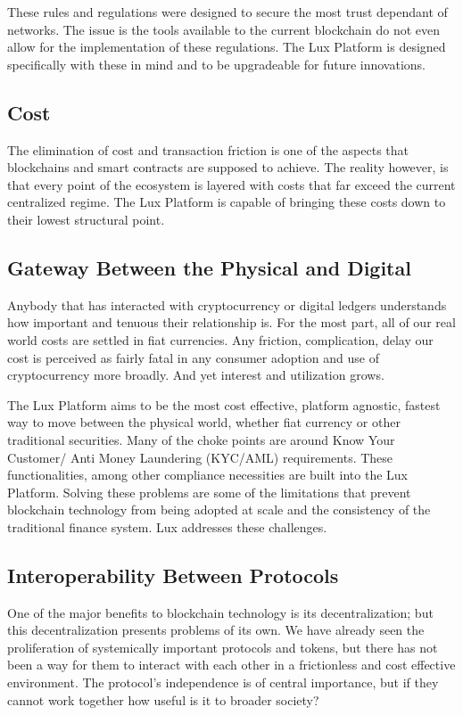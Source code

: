\documentclass[11pt]{article}
\begin{document}
These rules and regulations were designed to secure the most trust dependant of networks. The issue is the tools available to the current blockchain do not even allow for the implementation of these regulations. The Lux Platform is designed specifically with these in mind and to be upgradeable for future innovations.


\subsection{Cost}

The elimination of cost and transaction friction is one of the aspects that blockchains and smart contracts are supposed to achieve. The reality however, is that every point of the ecosystem is layered with costs that far exceed the current centralized regime. The Lux Platform is capable of bringing these costs down to their lowest structural point.


\subsection{Gateway Between the Physical and Digital}

Anybody that has interacted with cryptocurrency or digital ledgers understands how important and tenuous their relationship is. For the most part, all of our real world costs are settled in fiat currencies. Any friction, complication, delay our cost is perceived as fairly fatal in any consumer adoption and use of cryptocurrency more broadly. And yet interest and utilization grows.


The Lux Platform aims to be the most cost effective, platform agnostic, fastest way to move between the physical world, whether fiat currency or other traditional securities. Many of the choke points are around Know Your Customer/ Anti Money Laundering (KYC/AML) requirements. These functionalities, among other compliance necessities are built into the Lux Platform. Solving these problems are some of the limitations that prevent blockchain technology from being adopted at scale and the consistency of the traditional finance system. Lux addresses these challenges.


\subsection{Interoperability Between Protocols}

One of the major benefits to blockchain technology is its decentralization; but this decentralization presents problems of its own. We have already seen the proliferation of systemically important protocols and tokens, but there has not been a way for them to interact with each other in a frictionless and cost effective environment. The protocol's independence is of central importance, but if they cannot work together how useful is it to broader society?
\end{document}
